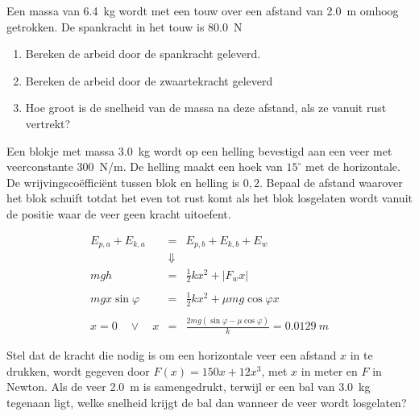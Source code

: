 \documentclass{ximera}
\begin{document}
	\author{Bart Lambregs}
    \xmsource\xmuitleg

\begin{exercise}
Een massa van \SI{6,4}{kg} wordt met een touw over een afstand van \SI{2,0}{m} omhoog getrokken. De spankracht in het touw is \SI{80,0}{N}
\begin{enumerate}
	\item Bereken de arbeid door de spankracht geleverd.
	\item Bereken de arbeid door de zwaartekracht geleverd
	\item Hoe groot is de snelheid van de massa na deze afstand, als ze vanuit rust vertrekt?
\end{enumerate}
\end{exercise}

\begin{exercise}
Een blokje met massa \SI{3,0}{kg} wordt op een helling bevestigd aan een veer met veerconstante \SI{300}{N/m}. De helling maakt een hoek van $15^{\circ}$ met de horizontale. De wrijvingscoëfficiënt tussen blok en helling is $0,2$. Bepaal de afstand waarover het blok schuift totdat het even tot rust komt als het blok losgelaten wordt vanuit de positie waar de veer geen kracht uitoefent. 
\begin{oplossing}
\begin{eqnarray*}
E_{p,a}+E_{k,a}&=&E_{p,b}+E_{k,b}+E_w\\
&\Downarrow&\\
mgh&=&\frac{1}{2}kx^2+|F_wx|\\
&&\\
mgx\sin\varphi&=&\frac{1}{2}kx^2+\mu mg\cos\varphi x\\
&&\\
x=0\quad\vee\quad x&=&\frac{2mg(\sin\varphi-\mu\cos\varphi)}{k}=\SI{0,0129}{m}
\end{eqnarray*}
\end{oplossing}
\end{exercise}

\begin{exercise}
Stel dat de kracht die nodig is om een horizontale veer een afstand $x$ in te drukken, wordt gegeven door $F(x)=150x+12x^3$, met $x$ in meter en $F$ in Newton. Als de veer \SI{2,0}{m} is samengedrukt, terwijl er een bal van \SI{3,0}{kg} tegenaan ligt, welke snelheid krijgt de bal dan wanneer de veer wordt losgelaten?
\end{exercise}
\end{document}
